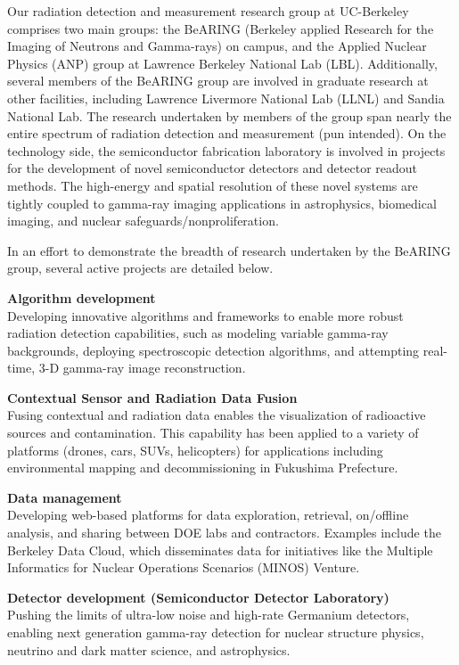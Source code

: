 Our radiation detection and measurement research group at UC-Berkeley comprises two main groups: the BeARING (Berkeley applied Research for the Imaging of Neutrons and Gamma-rays) on campus, and the Applied Nuclear Physics (ANP) group at Lawrence Berkeley National Lab (LBL). 
Additionally, several members of the BeARING group are involved in graduate research at other facilities, including Lawrence Livermore National Lab (LLNL) and Sandia National Lab. 
The research undertaken by members of the group span nearly the entire spectrum of radiation detection and measurement (pun intended). 
On the technology side, the semiconductor fabrication laboratory is involved in projects for the development of novel semiconductor detectors and detector readout methods. 
The high-energy and spatial resolution of these novel systems are tightly coupled to gamma-ray imaging applications in astrophysics, biomedical imaging, and nuclear safeguards/nonproliferation.

In an effort to demonstrate the breadth of research undertaken by the BeARING group, several active projects are detailed below.

\textbf{Algorithm development}\\
Developing innovative algorithms and frameworks to enable more robust radiation detection capabilities, such as modeling variable gamma-ray backgrounds, deploying spectroscopic detection algorithms, and attempting real-time, 3-D gamma-ray image reconstruction.

\textbf{Contextual Sensor and Radiation Data Fusion}\\
Fusing contextual and radiation data enables the visualization of radioactive sources and contamination. 
This capability has been applied to a variety of platforms (drones, cars, SUVs, helicopters) for applications including environmental mapping and decommissioning in Fukushima Prefecture.
 
\textbf{Data management}\\
Developing web-based platforms for data exploration, retrieval, on/offline analysis, and sharing between DOE labs and contractors.
Examples include the Berkeley Data Cloud, which disseminates data for initiatives like the Multiple Informatics for Nuclear Operations Scenarios (MINOS) Venture. 

\textbf{Detector development (Semiconductor Detector Laboratory)}\\
Pushing the limits of ultra-low noise and high-rate Germanium detectors, enabling next generation gamma-ray detection for nuclear structure physics, neutrino and dark matter science, and astrophysics. 
 

